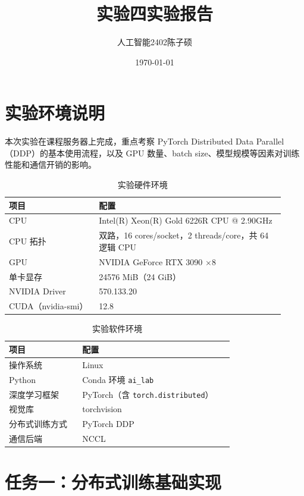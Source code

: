 \documentclass{article}
\title{实验四\hspace{2em}实验报告}
\author{人工智能2402\hspace{1em}陈子硕}
\date{\today}
\begin{document}
\maketitle

\section{实验环境说明}
本次实验在课程服务器上完成，重点考察 PyTorch Distributed Data Parallel（DDP）的基本使用流程，以及 GPU 数量、batch size、模型规模等因素对训练性能和通信开销的影响。

\begin{table}[htbp]
  \centering
  \caption{实验硬件环境}
  \label{tab:hardware_env_exp4}
  \begin{tabular}{p{0.30\linewidth} p{0.62\linewidth}}
    \toprule
    项目 & 配置 \\
    \midrule
    CPU & Intel(R) Xeon(R) Gold 6226R CPU @ 2.90GHz \\
    CPU 拓扑 & 双路，16 cores/socket，2 threads/core，共 64 逻辑 CPU \\
    GPU & NVIDIA GeForce RTX 3090 $\times 8$ \\
    单卡显存 & 24576 MiB（24 GiB） \\
    NVIDIA Driver & 570.133.20 \\
    CUDA（nvidia-smi） & 12.8 \\
    \bottomrule
  \end{tabular}
\end{table}

\begin{table}[htbp]
  \centering
  \caption{实验软件环境}
  \label{tab:software_env_exp4}
  \begin{tabular}{p{0.30\linewidth} p{0.62\linewidth}}
    \toprule
    项目 & 配置 \\
    \midrule
    操作系统 & Linux \\
    Python & Conda 环境 \texttt{ai\_lab} \\
    深度学习框架 & PyTorch（含 \texttt{torch.distributed}） \\
    视觉库 & torchvision \\
    分布式训练方式 & PyTorch DDP \\
    通信后端 & NCCL \\
    \bottomrule
  \end{tabular}
\end{table}

\section{任务一：分布式训练基础实现}
\end{document}
